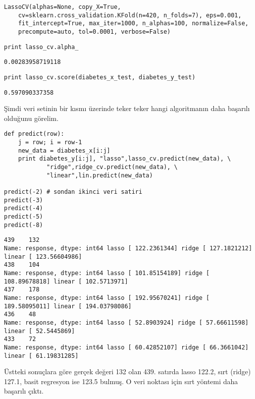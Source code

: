 \documentclass[12pt,fleqn]{article}\usepackage{../../common}
\begin{document}
\begin{verbatim}
LassoCV(alphas=None, copy_X=True,
    cv=sklearn.cross_validation.KFold(n=420, n_folds=7), eps=0.001,
    fit_intercept=True, max_iter=1000, n_alphas=100, normalize=False,
    precompute=auto, tol=0.0001, verbose=False)
\end{verbatim}

\begin{verbatim}
print lasso_cv.alpha_
\end{verbatim}

\begin{verbatim}
0.00283958719118
\end{verbatim}

\begin{verbatim}
print lasso_cv.score(diabetes_x_test, diabetes_y_test) 
\end{verbatim}

\begin{verbatim}
0.597090337358
\end{verbatim}

Şimdi veri setinin bir kısmı üzerinde teker teker hangi algoritmanın
daha başarılı olduğunu görelim. 

\begin{verbatim}
def predict(row):
    j = row; i = row-1
    new_data = diabetes_x[i:j]
    print diabetes_y[i:j], "lasso",lasso_cv.predict(new_data), \
    	    "ridge",ridge_cv.predict(new_data), \
      	    "linear",lin.predict(new_data)	    

predict(-2) # sondan ikinci veri satiri
predict(-3)
predict(-4)
predict(-5)
predict(-8)
\end{verbatim}

\begin{verbatim}
439    132
Name: response, dtype: int64 lasso [ 122.2361344] ridge [ 127.1821212] linear [ 123.56604986]
438    104
Name: response, dtype: int64 lasso [ 101.85154189] ridge [ 108.89678818] linear [ 102.5713971]
437    178
Name: response, dtype: int64 lasso [ 192.95670241] ridge [ 189.58095011] linear [ 194.03798086]
436    48
Name: response, dtype: int64 lasso [ 52.8903924] ridge [ 57.66611598] linear [ 52.5445869]
433    72
Name: response, dtype: int64 lasso [ 60.42852107] ridge [ 66.3661042] linear [ 61.19831285]
\end{verbatim}

Üstteki sonuçlara göre gerçek değeri 132 olan 439. satırda lasso 122.2,
sırt (ridge) 127.1, basit regresyon ise 123.5 bulmuş. O veri noktası için
sırt yöntemi daha başarılı çıktı.
\end{document}
